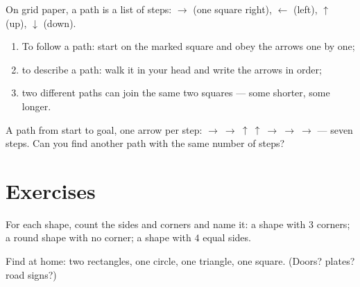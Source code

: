 \begin{method}\label{met:g1:shapes:path}
On grid paper, a path is a list of steps:
$\to$ (one square right), $\leftarrow$ (left), $\uparrow$ (up),
$\downarrow$ (down).
\begin{enumerate}
  \item To follow a path: start on the marked square and obey the
        arrows one by one;
  \item to describe a path: walk it in your head and write the
        arrows in order;
  \item two different paths can join the same two squares --- some
        shorter, some longer.
\end{enumerate}
\end{method}

\begin{omfigure}

{\small A path from start to goal, one arrow per step:
$\to\ \to\ \uparrow\ \uparrow\ \to\ \to\ \to$ --- seven steps. Can
you find another path with the same number of steps?}
\end{omfigure}

\section{Exercises}

\begin{exercise}[$\star$]\label{exo:g1:shapes:1}
For each shape, count the sides and corners and name it: a shape
with $3$ corners; a round shape with no corner; a shape with $4$
equal sides.
\end{exercise}

\begin{exercise}[$\star$]\label{exo:g1:shapes:2}
Find at home: two rectangles, one circle, one triangle, one square.
(Doors? plates? road signs?)
\end{exercise}

